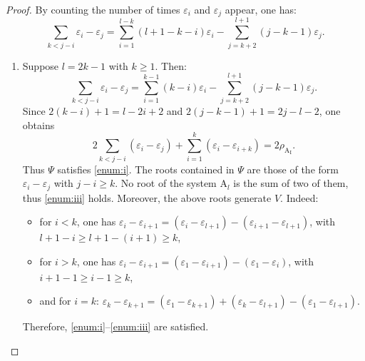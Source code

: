 \documentclass[JEP,XML,SOM,Unicode,published]{cedram}
\newcommand{\rI}{\mathrm{I}}
\theoremstyle{plain}
\theoremstyle{remark}
\theoremstyle{definition}
\begin{document}
\begin{proof}
By counting the number of times $\varepsilon_i$ and $\varepsilon_j$
appear, one has:\vspace*{-3pt}
\[\sum_{k<j-i} \varepsilon_i - \varepsilon_j =
\sum_{i =1}^{l-k} (l+1-k-i)\varepsilon_i
- \sum_{j = k+2}^{l+1} (j-k-1)\varepsilon_j.\]

\begin{enumerate}
\item
Suppose $l = 2k-1$ with $k \geqslant 1$. Then:\vspace*{-3pt}
\[\sum_{k<j-i} \varepsilon_i - \varepsilon_j =
\sum_{i =1}^{k-1} (k-i)\varepsilon_i
- \sum_{j = k+2}^{l+1} (j-k-1) \varepsilon_j.\]
Since $2(k - i)+1 = l-2i+2$ and $2(j-k-1) +1 = 2j-l-2$, one obtains\vspace*{-3pt}
\[2 \sum_{k<j-i} (\varepsilon_i - \varepsilon_j)
+ \sum_{i = 1}^k (\varepsilon_i - \varepsilon_{i+k})
= 2 \rho_{\mathrm{A}_\rI}.\]
Thus $\Psi$ satisfies \eqref{enum:i}.
The roots contained in $\Psi$ are those of the form $\varepsilon_i - \varepsilon_j$ with $j-i \geqslant k$.
No root of the system $\mathrm A_l$ is the sum of two of them, thus \eqref{enum:iii} holds.
Moreover, the above roots generate $V$. Indeed:
\begin{itemize}
\item for $i < k$, one has $\varepsilon_i - \varepsilon_{i+1} = (\varepsilon_i - \varepsilon_{l+1}) - (\varepsilon_{i+1} - \varepsilon_{l+1})$, with $l+1 -i \geqslant l+1 - (i+1) \geqslant k$,
\item for $i > k$, one has
$\varepsilon_i - \varepsilon_{i+1} = (\varepsilon_1 - \varepsilon_{i+1}) - (\varepsilon_1 - \varepsilon_i)$,
with $i+1 - 1 \geqslant i- 1 \geqslant k$,
\item and for $i=k$: $\varepsilon_k - \varepsilon_{k+1} =
(\varepsilon_1 - \varepsilon_{k+1}) + (\varepsilon_k - \varepsilon_{l+1}) - (\varepsilon_1 - \varepsilon_{l+1})$.
\end{itemize}
Therefore, \eqref{enum:i}--\eqref{enum:iii} are satisfied.


\end{enumerate}
\end{proof}
\end{document}

